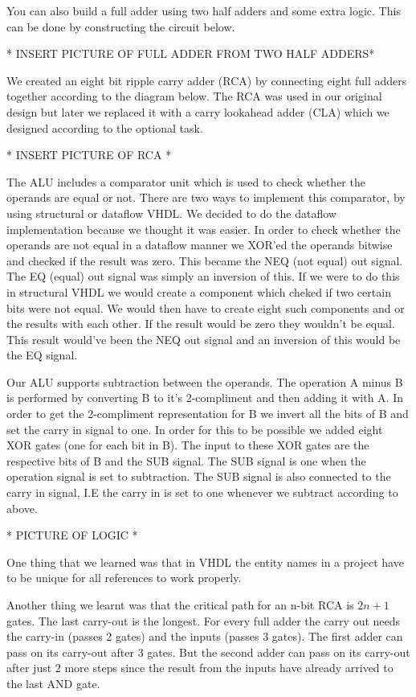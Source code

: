 \documentclass[a4paper,11pt]{article}
\begin{document}
You can also build a full adder using two half adders and some extra logic. This can be done by constructing the circuit below.

* INSERT PICTURE OF FULL ADDER FROM TWO HALF ADDERS*

We created an eight bit ripple carry adder (RCA) by connecting eight full adders together according to the diagram below. The RCA was used in our original design but later we replaced it with a carry lookahead adder (CLA) which we designed according to the optional task. 

* INSERT PICTURE OF RCA *

The ALU includes a comparator unit which is used to check whether the operands are equal or not. There are two ways to implement this comparator, by using structural or dataflow VHDL. We decided to do the dataflow implementation because we thought it was easier. In order to check whether the operands are not equal in a dataflow manner we XOR'ed the operands bitwise and checked if the result was zero. This became the NEQ (not equal) out signal. The EQ (equal) out signal was simply an inversion of this. If we were to do this in structural VHDL we would create a component which cheked if two certain bits were not equal. We would then have to create eight such components and or the results with each other. If the result would be zero they wouldn't be equal. This result would've been the NEQ out signal and an inversion of this would be the EQ signal. 

Our ALU supports subtraction between the operands. The operation A minus B is performed by converting B to it's 2-compliment and then adding it with A. In order to get the 2-compliment representation for B we invert all the bits of B and set the carry in signal to one. In order for this to be possible we added eight XOR gates (one for each bit in B). The input to these XOR gates are the respective bits of B and the SUB signal. The SUB signal is one when the operation signal is set to subtraction. The SUB signal is also connected to the carry in signal, I.E the carry in is set to one whenever we subtract according to above.

* PICTURE OF LOGIC *

One thing that we learned was that in VHDL the entity names in a project have to be unique for all references to work properly. 

Another thing we learnt was that the critical path for an n-bit RCA is $2n+1$ gates. The last carry-out is the longest. For every full adder the carry out needs the carry-in (passes 2 gates) and the inputs (passes 3 gates). The first adder can pass on its carry-out after 3 gates. But the second adder can pass on its carry-out after just 2 more steps since the result from the inputs have already arrived to the last AND gate.
\end{document}

